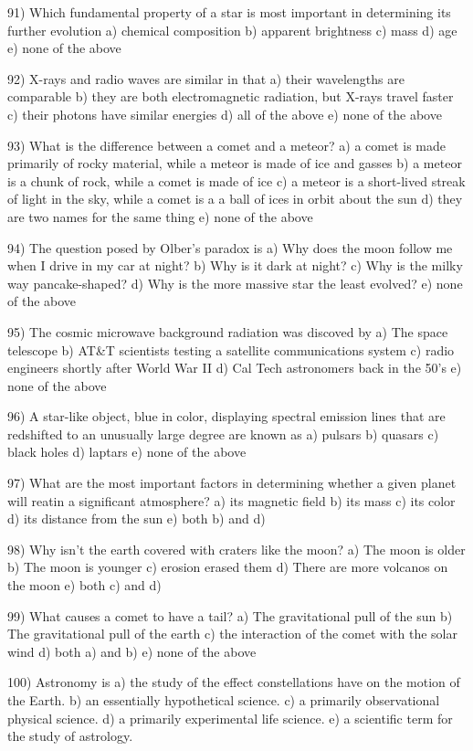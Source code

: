 91) Which fundamental property of a star is most important in determining
its further evolution
a) chemical composition b) apparent brightness
c) mass d) age e) none of the above

92) X-rays and radio waves are similar in that
a) their wavelengths are comparable
b) they are both electromagnetic radiation, but X-rays travel faster
c) their photons have similar energies
d) all of the above
e) none of the above

93) What is the difference between a comet and a meteor?
a) a comet is made primarily of rocky material, while a meteor
is made of ice and gasses
b) a meteor is a chunk of rock, while a comet is made of ice
c) a meteor is a short-lived streak of light in the sky, while
a comet is a a ball of ices in orbit about the sun
d) they are two names for the same thing
e) none of the above

94) The question posed by Olber's paradox is
a) Why does the moon follow me when I drive in my car at night?
b) Why is it dark at night?
c) Why is the milky way pancake-shaped?
d) Why is the more massive star the least evolved?
e) none of the above

95) The cosmic microwave background radiation was discoved by
a) The space telescope
b) AT&T scientists testing a satellite communications system
c) radio engineers shortly after World War II
d) Cal Tech astronomers back in the 50's
e) none of the above

96) A star-like object, blue in color, displaying spectral emission lines
that are redshifted to an unusually large degree are known as
a) pulsars b) quasars c) black holes d) laptars e) none of the above

97) What are the most important factors in determining whether a given planet
will reatin a significant atmosphere?
a) its magnetic field
b) its mass
c) its color
d) its distance from the sun
e) both b) and d)

98) Why isn't the earth covered with craters like the moon?
a) The moon is older
b) The moon is younger
c) erosion erased them
d) There are more volcanos on the moon
e) both c) and d)

99) What causes a comet to have a tail?
a) The gravitational pull of the sun
b) The gravitational pull of the earth
c) the interaction of the comet with the solar wind
d) both a) and b)
e) none of the above

100) Astronomy is
a) the study of the effect constellations have on the motion of the Earth.
b) an essentially hypothetical science.
c) a primarily observational physical science.
d) a primarily experimental life science.
e) a scientific term for the study of astrology.
